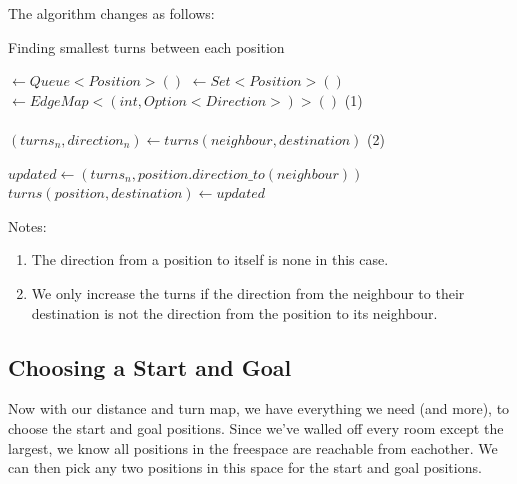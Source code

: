 \documentclass{article}
\begin{document}
The algorithm changes as follows:
\begin{algorithm}
\caption{Finding smallest turns between each position}\label{alg:turn-map}
\begin{algorithmic}
 $\gets Queue<Position>()$
 $\gets Set<Position>()$
 $\gets EdgeMap<(int, Option<Direction>)>()$ 
\Comment (1)
\\

\EndFor
\\

      \State $(turns_n, direction_n) \gets turns(neighbour, destination)$
        \Comment (2)
      \EndIf

        \State $updated \gets(turns_n, position.direction\_to(neighbour))$
        \State $turns(position, destination) \gets updated$
        \EndIf
      \EndIf
    \EndFor
  \EndFor
\EndWhile
\end{algorithmic}
\end{algorithm}

Notes:
\begin{enumerate}
  \item The direction from a position to itself is none in this case.
  \item We only increase the turns if the direction from the neighbour to their destination
    is not the direction from the position to its neighbour.
\end{enumerate}


\subsection{Choosing a Start and Goal}
Now with our distance and turn map, we have everything we need (and more), to choose the 
start and goal positions. Since we've walled off every room except the largest, we know 
all positions in the freespace are reachable from eachother. We can then pick any two 
positions in this space for the start and goal positions.
\end{document}
